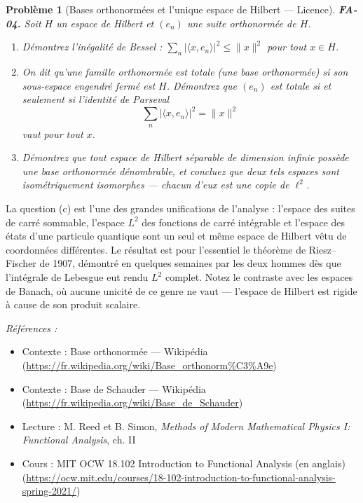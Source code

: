 \documentclass[11pt]{article}
\newtheorem{problem}{Problème}
\newenvironment{refs}{\par\small\noindent\emph{Références :}\begin{itemize}\setlength\itemsep{0pt}}{\end{itemize}\normalsize}
\begin{document}
\bigskip

\begin{problem}[{Bases orthonormées et l'unique espace de Hilbert --- Licence}]
\textbf{FA-04.} Soit $ H $ un espace de Hilbert et $ (e_n) $ une suite orthonormée de
$ H $.
\begin{enumerate}
\item[(a)] Démontrez l'inégalité de Bessel : $ \sum_n |\langle x, e_n\rangle|^2 \le \|x\|^2 $ pour tout
$ x \in H $.
\item[(b)] On dit qu'une famille orthonormée est \textit{totale} (une base orthonormée) si son sous-espace
engendré fermé est $ H $. Démontrez que $ (e_n) $ est totale si et seulement si l'identité de
Parseval
\[ \sum_n |\langle x, e_n\rangle|^2 = \|x\|^2 \]
vaut pour tout $ x $.
\item[(c)] Démontrez que tout espace de Hilbert séparable de dimension infinie possède une base orthonormée
dénombrable, et concluez que deux tels espaces sont isométriquement isomorphes --- chacun d'eux est
une copie de $ \ell^2 $.
\end{enumerate}

\end{problem}

\noindent La question (c) est l'une des grandes unifications de l'analyse : l'espace des suites
de carré sommable, l'espace $ L^2 $ des fonctions de carré intégrable et l'espace des états d'une
particule quantique sont un seul et même espace de Hilbert vêtu de coordonnées différentes. Le résultat
est pour l'essentiel le théorème de Riesz--Fischer de 1907, démontré en quelques semaines par les deux
hommes dès que l'intégrale de Lebesgue eut rendu $ L^2 $ complet. Notez le contraste avec les espaces
de Banach, où aucune unicité de ce genre ne vaut --- l'espace de Hilbert est rigide à cause de son
produit scalaire.

\begin{refs}
\item Contexte : Base orthonormée --- Wikipédia (\url{https://fr.wikipedia.org/wiki/Base_orthonorm%C3%A9e})
\item Contexte : Base de Schauder --- Wikipédia (\url{https://fr.wikipedia.org/wiki/Base_de_Schauder})
\item Lecture : M. Reed et B. Simon, \textit{Methods of Modern Mathematical Physics I: Functional Analysis}, ch. II
\item Cours : MIT OCW 18.102 Introduction to Functional Analysis (en anglais) (\url{https://ocw.mit.edu/courses/18-102-introduction-to-functional-analysis-spring-2021/})
\end{refs}
\end{document}
